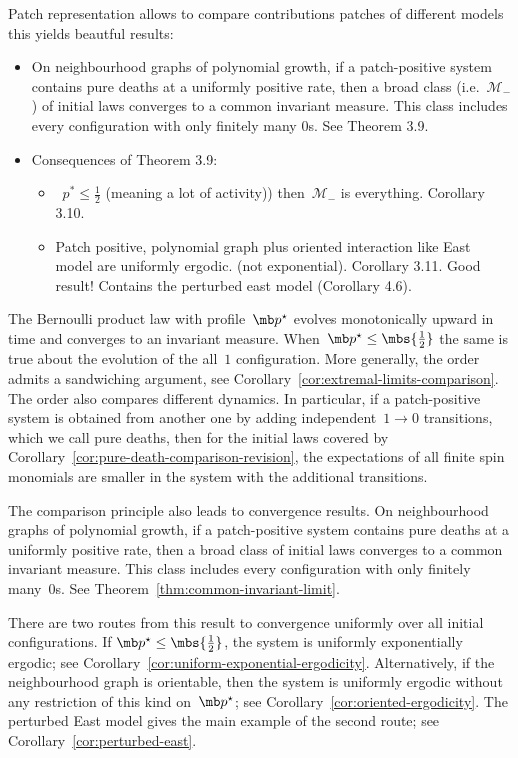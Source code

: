 {\color{red} Patch representation allows to compare contributions patches of different models this yields beautful results:
\begin{itemize}
  \item On neighbourhood graphs of
polynomial growth, if a patch-positive system contains pure deaths at a uniformly positive
rate, then a broad class (i.e.~$\mathcal{M}_{-}$) of initial laws converges to a common invariant measure. This class
includes every configuration with only finitely many 0s. See Theorem 3.9.
\item Consequences of Theorem 3.9:
  \begin{itemize}
  \item   ~$p^{*} \leq \frac{1}{2}$ (meaning a lot of activity)) then~$\mathcal{M}_{-}$ is everything. Corollary 3.10.
  \item  Patch positive, polynomial graph plus oriented interaction like East model are uniformly ergodic. (not exponential). Corollary 3.11. Good result! Contains the perturbed east model (Corollary 4.6). 
  \end{itemize}
\end{itemize}
  




}

The Bernoulli product law
with profile~$\mb p^\star$ evolves monotonically upward in time and converges to an
invariant measure. When~$\mb p^\star\leq\mbs{\tfrac12}$ the same is true about the evolution of the all~$1$ configuration.  More generally, the order admits a sandwiching argument, see Corollary~\ref{cor:extremal-limits-comparison}. The order also
compares different dynamics. In particular, if a patch-positive system is
obtained from another one by adding independent~$1\to0$ transitions, which we call pure deaths, then
for the initial laws covered by Corollary~\ref{cor:pure-death-comparison-revision},
the expectations of all finite spin monomials are smaller in the system with
the additional transitions.

The comparison principle also leads to convergence results. On neighbourhood
graphs of polynomial growth, if a patch-positive system contains pure deaths at a uniformly positive rate, then a broad class of
initial laws converges to a common invariant measure. This class includes every
configuration with only finitely many~$0$s. See
Theorem~\ref{thm:common-invariant-limit}.

There are two routes from this result to convergence uniformly
over all initial configurations. If
$\mb p^\star\leq\mbs{\tfrac12}$, the system is uniformly exponentially
ergodic; see Corollary~\ref{cor:uniform-exponential-ergodicity}. Alternatively,
if the neighbourhood graph is orientable, then the system is uniformly
ergodic without any restriction of this kind on~$\mb p^\star$; see
Corollary~\ref{cor:oriented-ergodicity}. The perturbed East model gives the main example
of the second route; see Corollary~\ref{cor:perturbed-east}.

